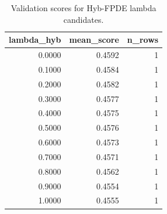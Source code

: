 \begin{table}[t]
\caption{Validation scores for Hyb-FPDE lambda candidates.}
\label{tab:lambda_distribution_computed}
\centering
\begin{tabular}{rrr}
\toprule
lambda\_hyb & mean\_score & n\_rows \\
\midrule
0.0000 & 0.4592 & 1 \\
0.1000 & 0.4584 & 1 \\
0.2000 & 0.4582 & 1 \\
0.3000 & 0.4577 & 1 \\
0.4000 & 0.4575 & 1 \\
0.5000 & 0.4576 & 1 \\
0.6000 & 0.4573 & 1 \\
0.7000 & 0.4571 & 1 \\
0.8000 & 0.4562 & 1 \\
0.9000 & 0.4554 & 1 \\
1.0000 & 0.4555 & 1 \\
\bottomrule
\end{tabular}

\end{table}
